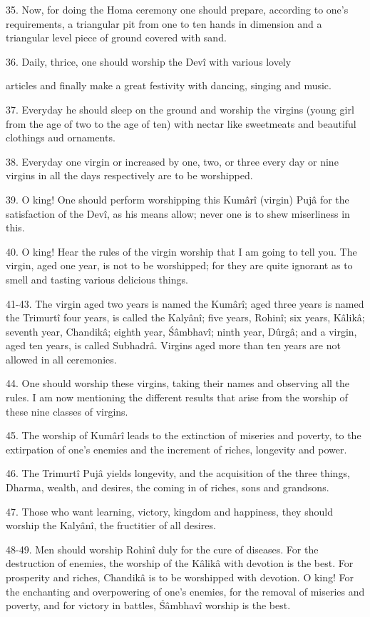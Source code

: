 35. Now, for doing the Homa ceremony one should prepare, according to one's requirements, a triangular pit from one to ten hands in dimension and a triangular level piece of ground covered with sand.

36. Daily, thrice, one should worship the Dev\^i with various lovely

articles and finally make a great festivity with dancing, singing and music.

37. Everyday he should sleep on the ground and worship the virgins (young girl from the age of two to the age of ten) with nectar like sweetmeats and beautiful clothings aud ornaments.

38. Everyday one virgin or increased by one, two, or three every day or nine virgins in all the days respectively are to be worshipped.

39. O king! One should perform worshipping this Kum\^ar\^i (virgin) Puj\^a for the satisfaction of the Dev\^i, as his means allow; never one is to shew miserliness in this.

40. O king! Hear the rules of the virgin worship that I am going to tell you. The virgin, aged one year, is not to be worshipped; for they are quite ignorant as to smell and tasting various delicious things.

41-43. The virgin aged two years is named the Kum\^ar\^i; aged three years is named the Trimurt\^i four years, is called the Kaly\^an\^i; five years, Rohin\^i; six years, K\^alik\^a; seventh year, Chandik\^a; eighth year, \'S\^ambhav\^i; ninth year, Dûrg\^a; and a virgin, aged ten years, is called Subhadr\^a. Virgins aged more than ten years are not allowed in all ceremonies.

44. One should worship these virgins, taking their names and observing all the rules. I am now mentioning the different results that arise from the worship of these nine classes of virgins.

45. The worship of Kum\^ar\^i leads to the extinction of miseries and poverty, to the extirpation of one's enemies and the increment of riches, longevity and power.

46. The Trimurt\^i Puj\^a yields longevity, and the acquisition of the three things, Dharma, wealth, and desires, the coming in of riches, sons and grandsons.

47. Those who want learning, victory, kingdom and happiness, they should worship the Kaly\^an\^i, the fructitier of all desires.

48-49. Men should worship Rohin\^i duly for the cure of diseases. For the destruction of enemies, the worship of the K\^alik\^a with devotion is the best. For prosperity and riches, Chandik\^a is to be worshipped with devotion. O king! For the enchanting and overpowering of one's enemies, for the removal of miseries and poverty, and for victory in battles, \'S\^ambhav\^i worship is the best.

